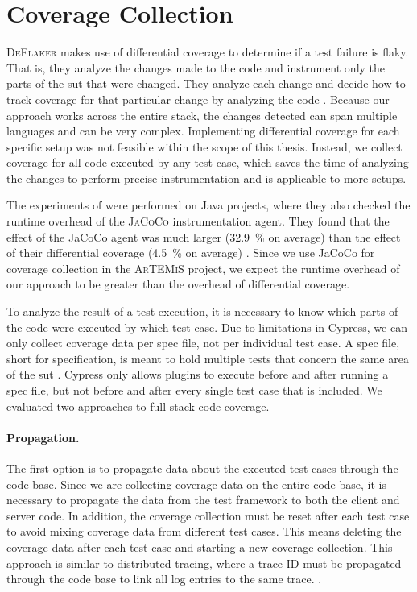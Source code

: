 \section{Coverage Collection}
\textsc{DeFlaker} makes use of differential coverage to determine if a test failure is flaky.
That is, they analyze the changes made to the code and instrument only the parts of the \ac{sut} that were changed.
They analyze each change and decide how to track coverage for that particular change by analyzing the code \autocite{bell_deflaker_2018}.
Because our approach works across the entire stack, the changes detected can span multiple languages and can be very complex.
Implementing differential coverage for each specific setup was not feasible within the scope of this thesis.
Instead, we collect coverage for all code executed by any test case, which saves the time of analyzing the changes to perform precise instrumentation and is applicable to more setups.

The experiments of \citeauthor*{bell_deflaker_2018} were performed on Java projects, where they also checked the runtime overhead of the \textsc{JaCoCo} instrumentation agent.
They found that the effect of the JaCoCo agent was much larger (\SI{32.9}{\percent} on average) than the effect of their differential coverage (\SI{4.5}{\percent} on average) \autocite{bell_deflaker_2018}.
Since we use JaCoCo for coverage collection in the \textsc{ArTEMiS} project, we expect the runtime overhead of our approach to be greater than the overhead of differential coverage.

To analyze the result of a test execution, it is necessary to know which parts of the code were executed by which test case.
Due to limitations in Cypress, we can only collect coverage data per spec file, not per individual test case.
A spec file, short for specification, is meant to hold multiple tests that concern the same area of the \ac{sut} \autocite{noauthor_writing_nodate}.
Cypress only allows plugins to execute before and after running a spec file, but not before and after every single test case that is included.
We evaluated two approaches to full stack code coverage.

\paragraph{Propagation.} The first option is to propagate data about the executed test cases through the code base.
Since we are collecting coverage data on the entire code base, it is necessary to propagate the data from the test framework to both the client and server code.
In addition, the coverage collection must be reset after each test case to avoid mixing coverage data from different test cases.
This means deleting the coverage data after each test case and starting a new coverage collection.
This approach is similar to distributed tracing, where a trace ID must be propagated through the code base to link all log entries to the same trace. \autocite{noauthor_distributed_nodate}.

